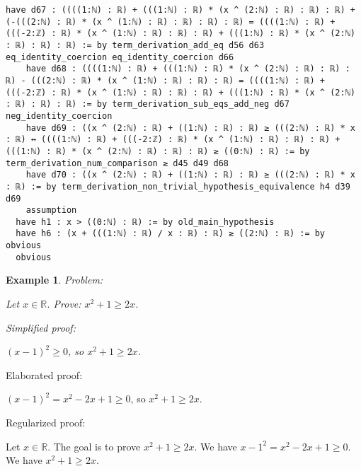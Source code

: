 \documentclass{article}
\newtheorem{example}{Example}
\begin{document}
\begin{tcolorbox}[colback=white!10, width=\linewidth]
\begin{lstlisting}[language=Lean4]
    have d67 : ((((1:ℕ) : ℝ) + (((1:ℕ) : ℝ) * (x ^ (2:ℕ) : ℝ) : ℝ) : ℝ) + (-(((2:ℕ) : ℝ) * (x ^ (1:ℕ) : ℝ) : ℝ) : ℝ) : ℝ) = ((((1:ℕ) : ℝ) + (((-2:ℤ) : ℝ) * (x ^ (1:ℕ) : ℝ) : ℝ) : ℝ) + (((1:ℕ) : ℝ) * (x ^ (2:ℕ) : ℝ) : ℝ) : ℝ) := by term_derivation_add_eq d56 d63 eq_identity_coercion eq_identity_coercion d66
    have d68 : ((((1:ℕ) : ℝ) + (((1:ℕ) : ℝ) * (x ^ (2:ℕ) : ℝ) : ℝ) : ℝ) - (((2:ℕ) : ℝ) * (x ^ (1:ℕ) : ℝ) : ℝ) : ℝ) = ((((1:ℕ) : ℝ) + (((-2:ℤ) : ℝ) * (x ^ (1:ℕ) : ℝ) : ℝ) : ℝ) + (((1:ℕ) : ℝ) * (x ^ (2:ℕ) : ℝ) : ℝ) : ℝ) := by term_derivation_sub_eqs_add_neg d67 neg_identity_coercion
    have d69 : ((x ^ (2:ℕ) : ℝ) + ((1:ℕ) : ℝ) : ℝ) ≥ (((2:ℕ) : ℝ) * x : ℝ) ↔ ((((1:ℕ) : ℝ) + (((-2:ℤ) : ℝ) * (x ^ (1:ℕ) : ℝ) : ℝ) : ℝ) + (((1:ℕ) : ℝ) * (x ^ (2:ℕ) : ℝ) : ℝ) : ℝ) ≥ ((0:ℕ) : ℝ) := by term_derivation_num_comparison ≥ d45 d49 d68
    have d70 : ((x ^ (2:ℕ) : ℝ) + ((1:ℕ) : ℝ) : ℝ) ≥ (((2:ℕ) : ℝ) * x : ℝ) := by term_derivation_non_trivial_hypothesis_equivalence h4 d39 d69
    assumption
  have h1 : x > ((0:ℕ) : ℝ) := by old_main_hypothesis
  have h6 : (x + (((1:ℕ) : ℝ) / x : ℝ) : ℝ) ≥ ((2:ℕ) : ℝ) := by obvious
  obvious

\end{lstlisting}
\end{tcolorbox}


\begin{example}
Problem:
\begin{tcolorbox}[colback=yellow!10, width=\linewidth]
Let $x\in\mathbb{R}$. Prove: $x^2 + 1\ge 2x$.
\end{tcolorbox}

Simplified proof:
\begin{tcolorbox}[colback=blue!10, width=\linewidth]
$(x-1)^2 \ge 0$, so $x^2 + 1 \ge 2x$.
\end{tcolorbox}
\end{example}

Elaborated proof:
\begin{tcolorbox}[colback=green!10, width=\linewidth]
$(x-1)^2 = x^2 - 2x + 1 \ge 0$, so $x^2 + 1 \ge 2x$.
\end{tcolorbox}

Regularized proof:
\begin{tcolorbox}[colback=red!10, width=\linewidth]
Let $x\in\mathbb{R}$.
The goal is to prove $x^2 + 1 \ge 2x$.
We have ${{x-1}}^2 = x^2 - 2x + 1 \ge 0$.
We have $x^2 + 1 \ge 2x$.
\end{tcolorbox}
\end{document}
